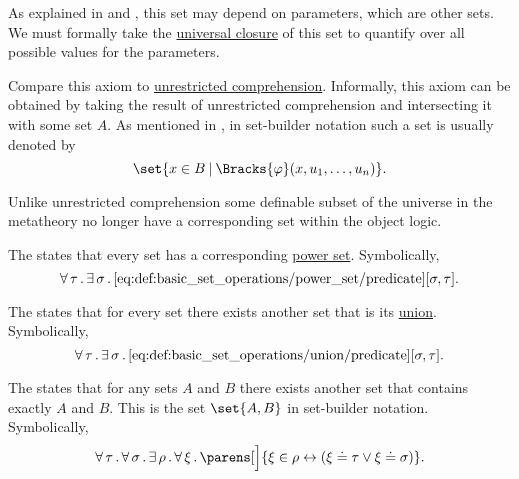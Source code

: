 \begin{definition}
\begin{thmenum}
    As explained in  and , this set may depend on parameters, which are other sets. We must formally take the \hyperref[thm:implicit_universal_quantification]{universal closure} of this set to quantify over all possible values for the parameters.

    Compare this axiom to \hyperref[def:naive_set_theory/unrestricted_comprehension]{unrestricted comprehension}. Informally, this axiom can be obtained by taking the result of unrestricted comprehension and intersecting it with some set \( A \). As mentioned in , in set-builder notation such a set is usually denoted by
    \begin{equation*}
      \set{ x \in B \given \Bracks{\varphi}(x, u_1, \ldots, u_n) }.
    \end{equation*}

    Unlike unrestricted comprehension some definable subset of the universe in the metatheory no longer have a corresponding set within the object logic.

     The  states that every set has a corresponding \hyperref[def:basic_set_operations/power_set]{power set}. Symbolically,
    \begin{equation}\label{eq:def:zfc/power_set}
      \forall \thinspace \tau \thinspace . \thinspace \exists \thinspace \sigma \thinspace . \thinspace \ref{eq:def:basic_set_operations/power_set/predicate}[\sigma, \tau].
    \end{equation}

     The  states that for every set there exists another set that is its \hyperref[def:basic_set_operations/union]{union}. Symbolically,
    \begin{equation}\label{eq:def:zfc/union}
      \forall \thinspace \tau \thinspace . \thinspace \exists \thinspace \sigma \thinspace . \thinspace \ref{eq:def:basic_set_operations/union/predicate}[\sigma, \tau].
    \end{equation}

     The  states that for any sets \( A \) and \( B \) there exists another set that contains exactly \( A \) and \( B \). This is the set \( \set{ A, B } \) in set-builder notation. Symbolically,
    \begin{equation}\label{eq:def:zfc/pairing}
      \qforall \tau \qforall \sigma \qexists \rho \qforall \xi \parens[\Big]{ \xi \in \rho \leftrightarrow ( \xi \doteq \tau \vee \xi \doteq \sigma) }.
    \end{equation}


\end{thmenum}
\end{definition}
